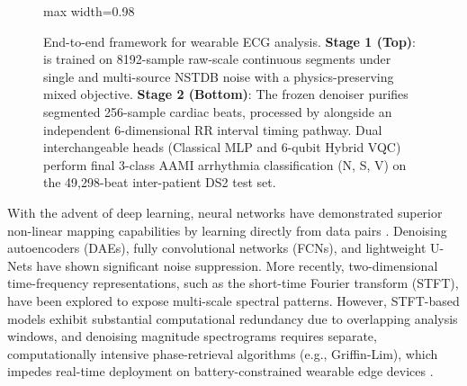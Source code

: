 \begin{figure}[!t]
\begin{adjustbox}{max width=0.98\textwidth}
\end{adjustbox}
\caption{End-to-end framework for wearable ECG analysis. \textbf{Stage 1 (Top)}: \HSL{} is trained on 8192-sample raw-scale continuous segments under single and multi-source NSTDB noise with a physics-preserving mixed objective. \textbf{Stage 2 (Bottom)}: The frozen denoiser purifies segmented 256-sample cardiac beats, processed by \RRN{} alongside an independent 6-dimensional RR interval timing pathway. Dual interchangeable heads (Classical MLP and 6-qubit Hybrid VQC) perform final 3-class AAMI arrhythmia classification (N, S, V) on the 49{,}298-beat inter-patient DS2 test set.}
\label{fig:pipeline}
\end{figure}

With the advent of deep learning, neural networks have demonstrated superior non-linear mapping capabilities by learning directly from data pairs \cite{vincent2008,chiang2019}. Denoising autoencoders (DAEs), fully convolutional networks (FCNs), and lightweight U-Nets \cite{ronneberger2015,xiong2016} have shown significant noise suppression. More recently, two-dimensional time-frequency representations, such as the short-time Fourier transform (STFT), have been explored to expose multi-scale spectral patterns. However, STFT-based models exhibit substantial computational redundancy due to overlapping analysis windows, and denoising magnitude spectrograms requires separate, computationally intensive phase-retrieval algorithms (e.g., Griffin-Lim), which impedes real-time deployment on battery-constrained wearable edge devices \cite{jin2024}.

